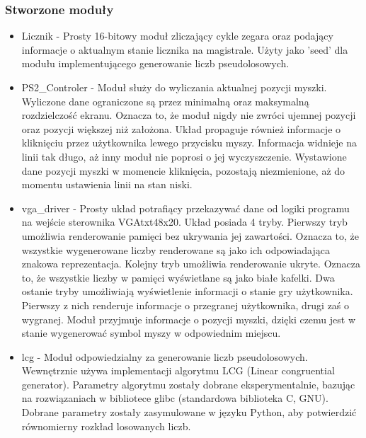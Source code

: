 \documentclass[polish,polish,a4paper]{article}
\begin{document}
\subsubsection{Stworzone moduły}
\begin{itemize}
 \item
  Licznik - Prosty 16-bitowy moduł zliczający cykle zegara oraz podający informacje o aktualnym stanie licznika na magistrale.
  Użyty jako 'seed' dla modułu implementującego generowanie liczb pseudolosowych.

 \item
  PS2\_Controler - Moduł służy do wyliczania aktualnej pozycji myszki.
  Wyliczone dane ograniczone są przez minimalną oraz maksymalną rozdzielczość ekranu.
  Oznacza to, że moduł nigdy nie zwróci ujemnej pozycji oraz pozycji większej niż założona.
  Układ propaguje również informacje o kliknięciu przez użytkownika lewego przycisku myszy.
  Informacja widnieje na linii tak długo, aż inny moduł nie poprosi o jej wyczyszczenie.
  Wystawione dane pozycji myszki w momencie kliknięcia, pozostają niezmienione, aż do momentu ustawienia linii na stan niski. 

 \item
  vga\_driver - Prosty układ potrafiący przekazywać dane od logiki programu na wejście sterownika VGAtxt48x20.
  Układ posiada 4 tryby.
  Pierwszy tryb umożliwia renderowanie pamięci bez ukrywania jej zawartości.
  Oznacza to, że wszystkie wygenerowane liczby renderowane są jako ich odpowiadająca znakowa reprezentacja.
  Kolejny tryb umożliwia renderowanie ukryte.
  Oznacza to, że wszystkie liczby w pamięci wyświetlane są jako białe kafelki.
  Dwa ostanie tryby umożliwiają wyświetlenie informacji o stanie gry użytkownika.
  Pierwszy z nich renderuje informacje o przegranej użytkownika, drugi zaś o wygranej.
  Moduł przyjmuje informacje o pozycji myszki, dzięki czemu jest w stanie wygenerować symbol myszy w odpowiednim miejscu.

 \item
  lcg - Moduł odpowiedzialny za generowanie liczb pseudolosowych.
  Wewnętrznie używa implementacji algorytmu LCG (Linear congruential generator).
  Parametry algorytmu zostały dobrane eksperymentalnie, bazując na rozwiązaniach w bibliotece glibc (standardowa biblioteka C, GNU).
  Dobrane parametry zostały zasymulowane w języku Python, aby potwierdzić równomierny rozkład losowanych liczb.


\end{itemize}
\end{document}
